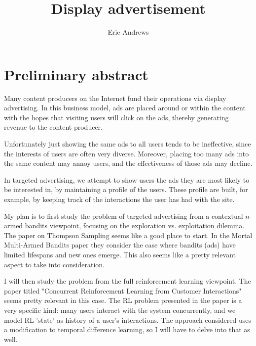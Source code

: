 \documentclass[a4paper,12pt]{article}
\begin{document}
\title{Display advertisement}
\author{Eric Andrews}

\maketitle

\section*{Preliminary abstract}
Many content producers on the Internet fund their operations via display
advertising. In this business model, ads are placed around or within the
content with the hopes that visiting users will click on the ads, thereby
generating revenue to the content producer.

Unfortunately just showing the same ads to all users tends to be ineffective,
since the interests of users are often very diverse. Moreover, placing too many
ads into the same content may annoy users, and the effectiveness of those ads
may decline.

In targeted advertising, we attempt to show users the ads they are most likely
to be interested in, by maintaining a profile of the users. These profile are
built, for example, by keeping track of the interactions the user has had with
the site.

My plan is to first study the problem of targeted advertising from a contextual
$n$-armed bandits viewpoint, focusing on the exploration vs. exploitation
dilemma. The paper on Thompson Sampling \cite{chapelle2011empirical} seems like
a good place to start. In the Mortal Multi-Armed Bandits paper
\cite{chakrabarti2008mortal} they consider the case where bandits (ads) have
limited lifespans and new ones emerge. This also seems like a pretty relevant
aspect to take into consideration.

I will then study the problem from the full reinforcement learning viewpoint.
The paper titled "Concurrent Reinforcement Learning from Customer Interactions"
\cite{silver2013concurrent} seems pretty relevant in this case. The RL problem
presented in the paper is a very specific kind: many users interact with the
system concurrently, and we model RL 'state' as history of a user's
interactions. The approach considered uses a modification to temporal
difference learning, so I will have to delve into that as well.


\nocite{*}

\printbibliography
\end{document}
